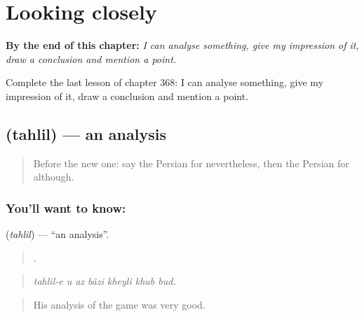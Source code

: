 
\chapter{Looking closely}
\label{ch:fa-looking-closely}

\begin{chapteropening}
\textbf{By the end of this chapter:} \emph{I can analyse something, give my impression of it, draw a conclusion and mention a point.}

Complete the last lesson of chapter 368: I can analyse something, give my impression of it, draw a conclusion and mention a point.
\end{chapteropening}

\section[\texorpdfstring{\fa{تحلیل} (tahlil)}{تحلیل (tahlil)}]{ (tahlil) — an analysis}

\label{lesson:FA-C368-tahlil}



\begin{quote}
Before the new one: say the Persian for nevertheless, then the Persian for although.
\end{quote}

\subsection*{You'll want to know: }
\textbf{} (\emph{tahlil}) — \textquotedblleft{}an analysis\textquotedblright{}.

\begin{quote}
      .
\end{quote}

\begin{quote}
\emph{tahlil-e u az bâzi kheyli khub bud.}
\end{quote}

\begin{quote}
His analysis of the game was very good.
\end{quote}

